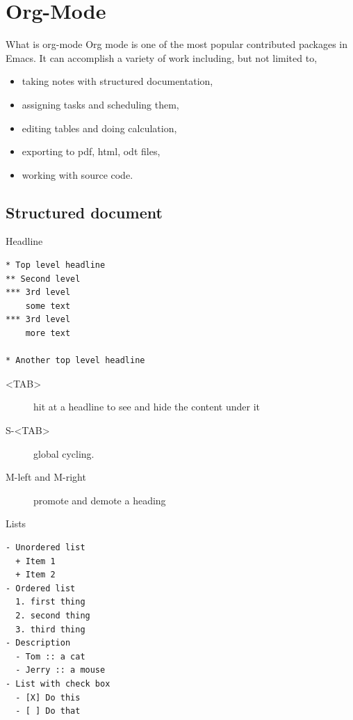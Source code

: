 \documentclass[presentation]{beamer}
\begin{document}
\section{Org-Mode}
\label{sec:org78ba197}

\begin{frame}[label={sec:orgbb0b7de}]{What is org-mode}
Org mode is one of the most popular contributed packages in Emacs. It
can accomplish a variety of work including, but not limited to,

\begin{itemize}
\item taking notes with structured documentation,
\item assigning tasks and scheduling them,
\item editing tables and doing calculation,
\item exporting to pdf, html, odt files,
\item \alert{working with source code}.
\end{itemize}
\end{frame}


\subsection{Structured document}
\label{sec:org03825f0}

\begin{frame}[fragile,label={sec:org484f2a6}]{Headline}
 \begin{verbatim}
* Top level headline
** Second level
*** 3rd level
    some text
*** 3rd level
    more text

* Another top level headline
\end{verbatim}

\begin{description}
\item[{<TAB>}] hit at a headline to see and hide the content under it
\item[{S-<TAB>}] global cycling.
\item[{M-left and M-right}] promote and demote a heading
\end{description}
\end{frame}

\begin{frame}[fragile,label={sec:orge4dc17d}]{Lists}
 \begin{verbatim}
- Unordered list
  + Item 1
  + Item 2
- Ordered list
  1. first thing
  2. second thing
  3. third thing
- Description
  - Tom :: a cat
  - Jerry :: a mouse
- List with check box
  - [X] Do this
  - [ ] Do that
\end{verbatim}
\end{frame}
\end{document}
